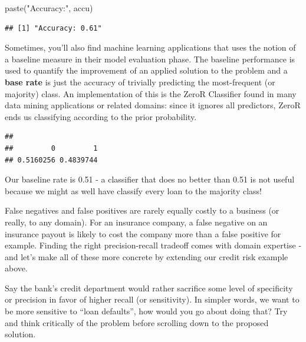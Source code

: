 \documentclass[
]{article}
\newenvironment{Shaded}{\begin{snugshade}}{\end{snugshade}}
\newcommand{\FunctionTok}[1]{\textcolor[rgb]{0.00,0.00,0.00}{#1}}
\newcommand{\NormalTok}[1]{#1}
\newcommand{\SpecialCharTok}[1]{\textcolor[rgb]{0.00,0.00,0.00}{#1}}
\newcommand{\StringTok}[1]{\textcolor[rgb]{0.31,0.60,0.02}{#1}}
\begin{document}
\begin{Shaded}
\begin{Highlighting}[]
\FunctionTok{paste}\NormalTok{(}\StringTok{"Accuracy:"}\NormalTok{, accu)}
\end{Highlighting}
\end{Shaded}

\begin{verbatim}
## [1] "Accuracy: 0.61"
\end{verbatim}

Sometimes, you'll also find machine learning applications that uses the
notion of a baseline measure in their model evaluation phase. The
baseline performance is used to quantify the improvement of an applied
solution to the problem and a \textbf{base rate} is just the accuracy of
trivially predicting the most-frequent (or majority) class. An
implementation of this is the ZeroR Classifier found in many data mining
applications or related domains: since it ignores all predictors, ZeroR
ends us classifying according to the prior probability.

\begin{Shaded}
\end{Shaded}

\begin{verbatim}
## 
##         0         1 
## 0.5160256 0.4839744
\end{verbatim}

Our baseline rate is 0.51 - a classifier that does no better than 0.51
is not useful because we might as well have classify every loan to the
majority class!

False negatives and false positives are rarely equally costly to a
business (or really, to any domain). For an insurance company, a false
negative on an insurance payout is likely to cost the company more than
a false positive for example. Finding the right precision-recall
tradeoff comes with domain expertise - and let's make all of these more
concrete by extending our credit risk example above.

Say the bank's credit department would rather sacrifice some level of
specificity or precision in favor of higher recall (or sensitivity). In
simpler words, we want to be more sensitive to ``loan defaults'', how
would you go about doing that? Try and think critically of the problem
before scrolling down to the proposed solution.
\end{document}
